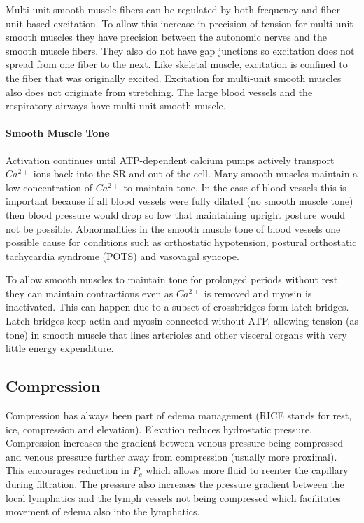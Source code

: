 Multi-unit smooth muscle fibers can be regulated by both frequency and fiber unit based excitation. To allow this increase in precision of tension for multi-unit smooth muscles they have precision between the autonomic nerves and the smooth muscle fibers. They also do not have gap junctions so excitation does not spread from one fiber to the next. Like skeletal muscle, excitation is confined to the fiber that was originally excited. Excitation for multi-unit smooth muscles also does not originate from stretching. The large blood vessels and the respiratory airways have multi-unit smooth muscle.

\paragraph{Smooth Muscle Tone}

Activation continues until ATP-dependent calcium pumps actively transport $Ca^{2+}$  ions back into the SR and out of the cell. Many smooth muscles maintain a low concentration of  $Ca^{2+}$ to maintain tone. In the case of blood vessels this is important because if all blood vessels were fully dilated (no smooth muscle tone) then blood pressure would drop so low that maintaining upright posture would not be possible. Abnormalities in the smooth muscle tone of blood vessels one possible cause for conditions such as orthostatic hypotension, postural orthostatic tachycardia syndrome (POTS) and vasovagal syncope.

To allow smooth muscles to maintain tone for prolonged periods without rest they can maintain contractions even as  $Ca^{2+}$ is removed and myosin is inactivated. This can happen due to a subset of crossbridges form latch-bridges. Latch bridges keep actin and myosin connected without ATP, allowing tension (as tone) in smooth muscle that lines arterioles and other visceral organs with very little energy expenditure.

\subsection{Compression}

Compression has always been part of edema management (RICE stands for rest, ice, compression and elevation). Elevation reduces hydrostatic pressure. Compression increases the gradient between venous pressure being compressed and venous pressure further away from compression (usually more proximal). This encourages reduction in $P_c$ which allows more fluid to reenter the capillary during filtration. The pressure also increases the pressure gradient between the local lymphatics and the lymph vessels not being compressed which facilitates movement of edema also into the lymphatics.

